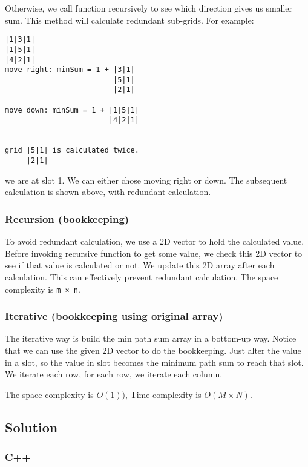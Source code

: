 \documentclass[11pt]{article}
\begin{document}
Otherwise, we call function recursively to see which direction gives us smaller sum. This method will calculate redundant sub-grids. For example:
\begin{Verbatim}[frame=single]
|1|3|1|
|1|5|1|
|4|2|1|
move right: minSum = 1 + |3|1|
                         |5|1|
                         |2|1|
                         
move down: minSum = 1 + |1|5|1|
                        |4|2|1|
                        

grid |5|1| is calculated twice.
     |2|1|

\end{Verbatim}
we are at slot 1. We can either chose moving right or down. The subsequent calculation is shown above, with redundant calculation.
\subsubsection{Recursion (bookkeeping)}
\label{sec:orgcf62f3d}
To avoid redundant calculation, we use a 2D vector to hold the calculated value. Before invoking recursive function to get some value, we check this 2D vector to see if that value is calculated or not. We update this 2D array after each calculation. This can effectively prevent redundant calculation. The space complexity is \texttt{m × n}.
\subsubsection{Iterative (bookkeeping using original array)}
\label{sec:orgb41c592}
The iterative way is build the min path sum array in a bottom-up way. Notice that we can use the given 2D vector to do the bookkeeping. Just alter the value in a slot, so the value in slot becomes the minimum path sum to reach that slot. We iterate each row, for each row, we iterate each column.

The space complexity is \(O(1))\), Time complexity is \(O(M \times N)\).

\subsection{Solution}
\label{sec:orga80d78b}
\subsubsection{C++}
\label{sec:org668dcfd}
\end{document}
